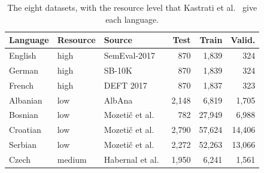 \begin{table}[t]
\centering
\caption{The eight datasets, with the resource level that Kastrati et al.~\cite{kastrati2026language} give each language.}
\label{tab:datasets}
\setlength{\tabcolsep}{3pt}
\begin{tabular}{@{}lllrrr@{}}
\toprule
Language & Resource & Source & Test & Train & Valid. \\
\midrule
English & high & SemEval-2017~\cite{rosenthal2017semeval,barbieri2022xlmt} & 870 & 1,839 & 324 \\
German & high & SB-10K~\cite{cieliebak2017sb10k,barbieri2022xlmt} & 870 & 1,839 & 324 \\
French & high & DEFT 2017~\cite{benamara2017deft,barbieri2022xlmt} & 870 & 1,837 & 323 \\
Albanian & low & AlbAna~\cite{kastrati2021albana} & 2,148 & 6,819 & 1,705 \\
Bosnian & low & Mozeti\v{c} et al.~\cite{mozetic2016multilingual} & 782 & 27,949 & 6,988 \\
Croatian & low & Mozeti\v{c} et al.~\cite{mozetic2016multilingual} & 2,790 & 57,624 & 14,406 \\
Serbian & low & Mozeti\v{c} et al.~\cite{mozetic2016multilingual} & 2,272 & 52,263 & 13,066 \\
Czech & medium & Habernal et al.~\cite{habernal2013czech} & 1,950 & 6,241 & 1,561 \\
\bottomrule
\end{tabular}
\end{table}
